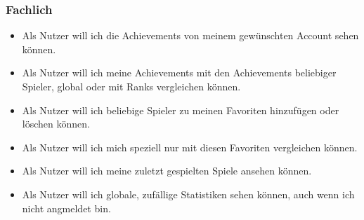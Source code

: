 \subsubsection{Fachlich}

\begin{itemize}
    \item Als Nutzer will ich die Achievements von meinem gewünschten Account sehen können.
    \item Als Nutzer will ich meine Achievements mit den Achievements beliebiger Spieler, global oder mit Ranks vergleichen können.
    \item Als Nutzer will ich beliebige Spieler zu meinen Favoriten hinzufügen oder löschen können.
    \item Als Nutzer will ich mich speziell nur mit diesen Favoriten vergleichen können.
    \item Als Nutzer will ich meine zuletzt gespielten Spiele ansehen können.
    \item Als Nutzer will ich globale, zufällige Statistiken sehen können, auch wenn ich nicht angmeldet bin.
\end{itemize}

